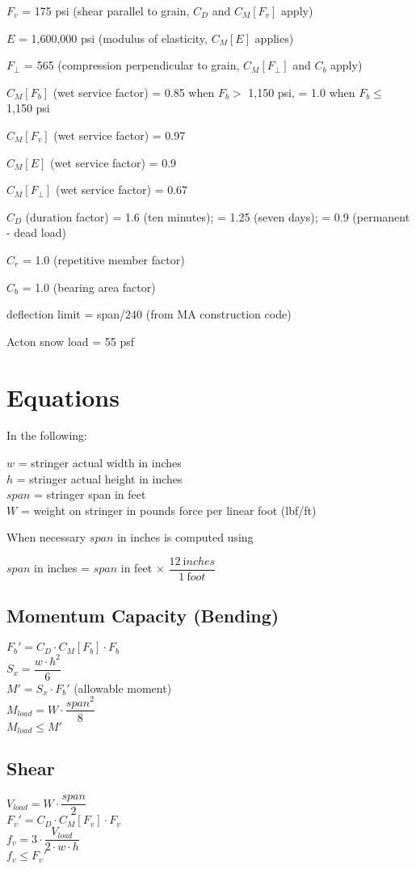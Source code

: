 \documentclass[12pt]{article}
\newenvironment{indpar}[1][0.3in]%
	{\begin{list}{}%
		     {\setlength{\itemsep}{0in}%
		      \setlength{\topsep}{0in}%
		      \setlength{\parsep}{1ex}%
		      \setlength{\labelwidth}{#1}%
		      \setlength{\leftmargin}{#1}%
		      \addtolength{\leftmargin}{\labelsep}}%
	 \item}%
	{\end{list}}
\begin{document}
$F_v$ = 175 psi (shear parallel to grain, $C_D$ and $C_M[F_v]$ apply)

$E$ = 1,600,000 psi (modulus of elasticity, $C_M[E]$ applies)

$F_\perp$ = 565 (compression perpendicular to grain, $C_M[F_\perp]$ and $C_b$
                 apply)

$C_M[F_b]$ (wet service factor)
    = 0.85 when $F_b >$ 1,150 psi, = 1.0 when $F_b \leq$ 1,150 psi

$C_M[F_v]$ (wet service factor) = 0.97

$C_M[E]$ (wet service factor) = 0.9

$C_M[F_\perp]$ (wet service factor) = 0.67

$C_D$ (duration factor) = 1.6 (ten minutes); = 1.25 (seven days);
                        = 0.9 (permanent - dead load)

$C_r$ = 1.0 (repetitive member factor)

$C_b$ = 1.0 (bearing area factor)

deflection limit = span/240 (from MA construction code)

Acton snow load = 55 psf

\newpage
\section{Equations}

In the following:

\begin{indpar}
$w$ = stringer actual width in inches \\
$h$ = stringer actual height in inches \\
$span$ = stringer span in feet \\
$W$ = weight on stringer in pounds force per linear foot (lbf/ft)
\end{indpar}
When necessary $span$ in inches is computed using
\begin{indpar}
$span$ in inches  = $span$ in feet $\times$
                    $\dfrac{12~\mathrm inches}{1~\mathrm foot}$
\end{indpar}

\subsection{Momentum Capacity (Bending)}

$F_b' = C_D \cdot C_M[F_b] \cdot F_b$ \\[0.5ex]
$S_x = \dfrac{w\cdot h^2}{6}$ \\[0.5ex]
$M' = S_x \cdot F_b'$ (allowable moment) \\[0.5ex]
$M_{load} = W \cdot \dfrac{span^2}{8}$ \\[0.5ex]
$M_{load} \leq M'$

\subsection{Shear}

$V_{load} = W \cdot \dfrac{span}{2}$ \\[0.5ex]
$F_v' = C_D \cdot C_M[F_v] \cdot F_v$ \\[0.5ex]
$f_v = 3 \cdot \dfrac{V_{load}}{2 \cdot w \cdot h}$ \\[0.5ex]
$f_v \leq F_v'$
\end{document}
